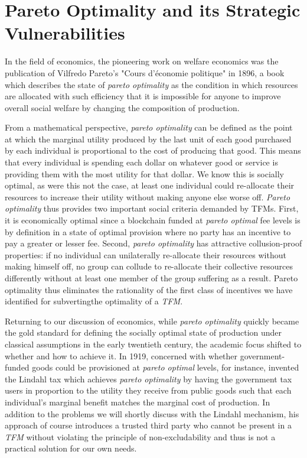 \documentclass[sigconf,anonymous]{aamas}
\begin{document}
\section{Pareto Optimality and its Strategic Vulnerabilities\label{sec::section1p2}}

In the field of economics, the pioneering work on welfare economics was the publication of Vilfredo Pareto's "Cours d'économie politique" in 1896, a book which describes the state of \textit{pareto optimality} as the condition in which resources are allocated with such efficiency that it is impossible for anyone to improve overall social welfare by changing the composition of production. 

From a mathematical perspective, \textit{pareto optimality} can be defined as the point at which the marginal utility produced by the last unit of each good purchased by each individual is proportional to the cost of producing that good. This means that every individual is spending each dollar on whatever good or service is providing them with the most utility for that dollar. We know this is socially optimal, as were this not the case, at least one individual could re-allocate their resources to increase their utility without making anyone else worse off. \textit{Pareto optimality} thus provides two important social criteria demanded by TFMs. First, it is economically optimal since a blockchain funded at \textit{pareto optimal} fee levels is by definition in a state of optimal provision where no party has an incentive to pay a greater or lesser fee. Second, \textit{pareto optimality} has attractive collusion-proof properties: if no individual can unilaterally re-allocate their resources without making himself off, no group can collude to re-allocate their collective resources differently without at least one member of the group suffering as a result. Pareto optimality thus eliminates the rationality of the first class of incentives we have identified for subvertingthe optimality of a \textit{TFM}.

Returning to our discussion of economics, while \textit{pareto optimality} quickly became the gold standard for defining the socially optimal state of production under classical assumptions in the early twentieth century, the academic focus shifted to whether and how to achieve it. In 1919, concerned with whether government-funded goods could be provisioned at \textit{pareto optimal} levels, for instance, \citet{lindahl1919gerechtigkeit} invented the Lindahl tax which achieves  \textit{pareto optimality} by having the government tax users in proportion to the utility they receive from public goods such that each individual’s marginal benefit matches the marginal cost of production. In addition to the problems we will shortly discuss with the Lindahl mechanism, his approach of course introduces a trusted third party who cannot be present in a \textit{TFM} without violating the principle of non-excludability and thus is not a practical solution for our own needs.
\end{document}
